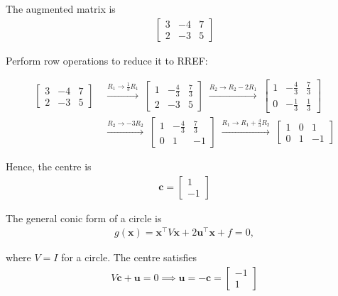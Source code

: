 \documentclass[journal]{IEEEtran}
\begin{document}
The augmented matrix is
\begin{align}
\left[\begin{array}{cc|c}
3 & -4 & 7 \\
2 & -3 & 5
\end{array}\right]
\end{align}

Perform row operations to reduce it to RREF:

\begin{align}
\left[\begin{array}{cc|c}
3 & -4 & 7 \\
2 & -3 & 5
\end{array}\right]
&\;\xrightarrow{R_1 \rightarrow \frac{1}{3} R_1}\;
\left[\begin{array}{cc|c}
1 & -\frac{4}{3} & \frac{7}{3} \\
2 & -3 & 5
\end{array}\right]
\;\xrightarrow{R_2 \rightarrow R_2 - 2R_1}\;
\left[\begin{array}{cc|c}
1 & -\frac{4}{3} & \frac{7}{3} \\
0 & -\frac{1}{3} & \frac{1}{3}
\end{array}\right] \\
&\;\xrightarrow{R_2 \rightarrow -3 R_2}\;
\left[\begin{array}{cc|c}
1 & -\frac{4}{3} & \frac{7}{3} \\
0 & 1 & -1
\end{array}\right]
\;\xrightarrow{R_1 \rightarrow R_1 + \frac{4}{3} R_2}\;
\left[\begin{array}{cc|c}
1 & 0 & 1 \\
0 & 1 & -1
\end{array}\right]
\end{align}

Hence, the centre is
\begin{align}
\mathbf{c} = \begin{bmatrix} 1 \\ -1 \end{bmatrix}
\end{align}

The general conic form of a circle is
\begin{align}
g(\mathbf{x}) = \mathbf{x}^\top V \mathbf{x} + 2 \mathbf{u}^\top \mathbf{x} + f = 0, 
\end{align}

where $V = I$ for a circle. The centre satisfies
\begin{align}
V \mathbf{c} + \mathbf{u} = 0 \implies \mathbf{u} = -\mathbf{c}
= \begin{bmatrix} -1 \\ 1 \end{bmatrix}
\end{align}
\end{document}
